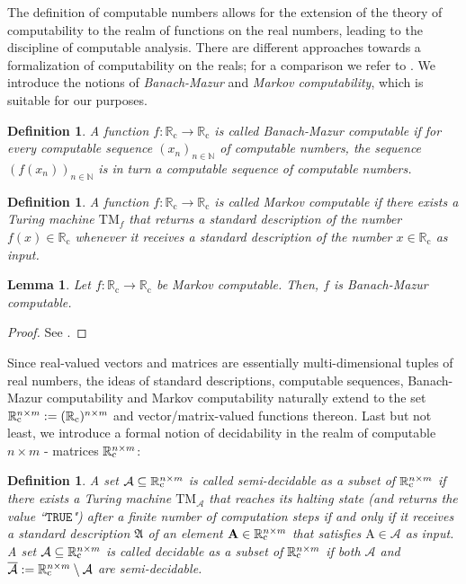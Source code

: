 \documentclass[conference]{IEEEtran}
\def\A{{\mathcal A}}
\def\NN{{\mathbb N}}
\def\RR{{\mathbb R}}
\newcommand{\RRc}{\RR_{\mathrm{c}}}
\def\mA{\bm{\mathrm{A}}}
\newcommand{\TM}{\mathrm{TM}}
\newcommand{\RRcP}[1]{\mathrlap{\phantom{\RR}_{\mathrm{c}}}\RR^{#1}}
\newtheorem{Definition}[Theorem]{Definition}
\newtheorem{Lemma}[Theorem]{Lemma}
\begin{document}
	The definition of computable numbers allows for the extension of the theory of computability to the realm of functions on the real numbers, 
	leading to the discipline of computable analysis. There are different approaches towards a formalization of computability on the reals; for a comparison 
	we refer to \cite{AB14}. We introduce the notions of \emph{Banach-Mazur} and \emph{Markov computability}, which is suitable for our purposes. 

	\begin{Definition}  \label{Borel}
						A function \(f : \RRc \to \RRc\) is called Banach-Mazur computable %
						if for every computable sequence \((x_n)_{n\in\NN}\) of computable numbers, the sequence
						\((f(x_n))_{n\in\NN}\) is in turn a computable sequence of computable numbers.
	\end{Definition}
	
	\begin{Definition}  \label{Borel}
						A function \(f : \RRc \to \RRc\) is called Markov computable %
						if there exists a Turing machine \(\TM_f\) that returns a standard description
						of the number \(f(x) \in \RRc\) whenever it receives a standard description of the number \(x\in \RRc\) as input.
	\end{Definition}
	
	\begin{Lemma}	Let \(f : \RRc \to \RRc\) be Markov computable. Then, \(f\) is Banach-Mazur computable.	
	\end{Lemma}\begin{proof}
					See \cite{AB14}.
	\end{proof}

	\noindent Since real-valued vectors and matrices are essentially multi-dimensional tuples of real numbers, the ideas of standard descriptions, computable sequences,
	Banach-Mazur computability and Markov computability naturally extend to the set \(\RRcP{n\times m} := (\RRc)^{n\times m}\) and vector/matrix-valued functions thereon. 
	{\color{red} Last but not least, we introduce a formal notion of decidability in the realm of computable \(n\times m\) - matrices \(\RRcP{n\times m}\):}

	{\color{red}\begin{Definition}  
						A set \(\A \subseteq \RRcP{n\times m}\) is called \emph{semi-decidable} as a subset of \(\RRcP{n\times m}\) 
						if there exists a Turing machine \(\TM_{\A}\) that reaches its halting state (and returns the value ``\(\mathtt{TRUE}\)") 
						after a finite number of computation steps if and only if it receives a standard description \(\mathfrak{A}\) of an element 
						\(\mA \in \RRcP{n\times m}\) that satisfies \(\mA\in\A\) as input. A set \(\A \subseteq \RRcP{n\times m}\) is called 
						\emph{decidable} as a subset of \(\RRcP{n\times m}\) if both \(\A\) and \(\overline{\A} := \RRcP{n\times m}\setminus\A\) are semi-decidable.
	\end{Definition}} 
	
\end{document}
